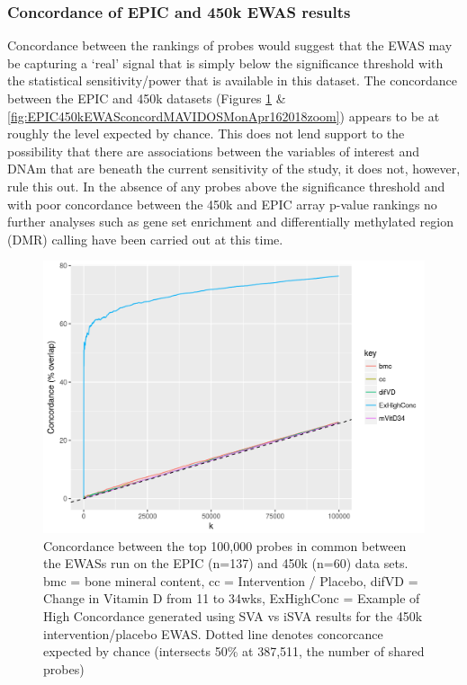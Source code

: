 \documentclass[
]{book}
\begin{document}
\hypertarget{concordance-of-epic-and-450k-ewas-results-1}{%
\subsubsection{Concordance of EPIC and 450k EWAS results}\label{concordance-of-epic-and-450k-ewas-results-1}}

Concordance between the rankings of probes would suggest that the EWAS may be capturing a `real' signal that is simply below the significance threshold with the statistical sensitivity/power that is available in this dataset.
The concordance between the EPIC and 450k datasets (Figures \ref{fig:EPIC450kEWASconcordMAVIDOSMonApr162018} \& \ref{fig:EPIC450kEWASconcordMAVIDOSMonApr162018zoom}) appears to be at roughly the level expected by chance.
This does not lend support to the possibility that there are associations between the variables of interest and DNAm that are beneath the current sensitivity of the study, it does not, however, rule this out.
In the absence of any probes above the significance threshold and with poor concordance between the 450k and EPIC array p-value rankings no further analyses such as gene set enrichment and differentially methylated region (DMR) calling have been carried out at this time.

\begin{figure}

{\centering \includegraphics[width=0.8\linewidth]{figs/EPIC450kEWASconcordMAVIDOSMonApr162018} 

}

\caption{Concordance between the top 100,000 probes in common between the EWASs run on the EPIC (n=137) and 450k (n=60) data sets. bmc = bone mineral content, cc = Intervention / Placebo, difVD = Change in Vitamin D from 11 to 34wks, ExHighConc = Example of High Concordance generated using SVA vs iSVA results for the 450k intervention/placebo EWAS. Dotted line denotes concorcance expected by chance (intersects 50\% at 387,511, the number of shared probes)}\label{fig:EPIC450kEWASconcordMAVIDOSMonApr162018}
\end{figure}
\end{document}
